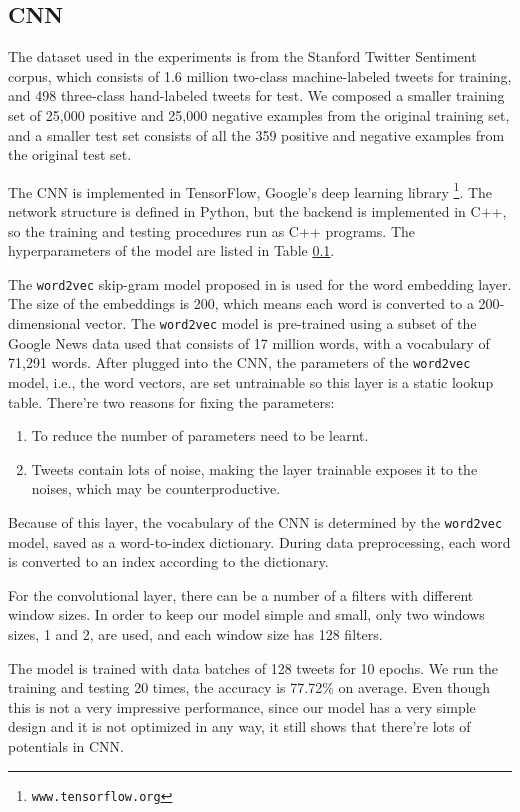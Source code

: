 \subsection{CNN}

The dataset used in the experiments is from the Stanford Twitter Sentiment corpus, which consists of 1.6 million two-class machine-labeled tweets for training, and 498 three-class hand-labeled tweets for test. We composed a smaller training set of 25,000 positive and 25,000 negative examples from the original training set, and a smaller test set consists of all the 359 positive and negative examples from the original test set. 

The CNN is implemented in TensorFlow, Google's deep learning library \footnote{\tt www.tensorflow.org}. The network structure is defined in Python, but the backend is implemented in C++, so the training and testing procedures run as C++ programs. The hyperparameters of the model are listed in Table \ref{}. 

The {\tt word2vec} skip-gram model proposed in \cite{mikolov2013} is used for the word embedding layer. The size of the embeddings is 200, which means each word is converted to a 200-dimensional vector. The {\tt word2vec} model is pre-trained using a subset of the Google News data used \cite{mikolov2013} that consists of 17 million words, with a vocabulary of 71,291 words. After plugged into the CNN, the parameters of the {\tt word2vec} model, i.e., the word vectors, are set untrainable so this layer is a static lookup table. There're two reasons for fixing the parameters:
\begin{enumerate}
\item To reduce the number of parameters need to be learnt.
\item Tweets contain lots of noise, making the layer trainable exposes it to the noises, which may be counterproductive.
\end{enumerate}
Because of this layer, the vocabulary of the CNN is determined by the {\tt word2vec} model, saved as a word-to-index dictionary. During data preprocessing, each word is converted to an index according to the dictionary. 

For the convolutional layer, there can be a number of a filters with different window sizes. In order to keep our model simple and small, only two windows sizes, 1 and 2, are used, and each window size has 128 filters. 

The model is trained with data batches of 128 tweets for 10 epochs. We run the training and testing 20 times, the accuracy is 77.72\% on average. Even though this is not a very impressive performance, since our model has a very simple design and it is not optimized in any way, it still shows that there're lots of potentials in CNN.